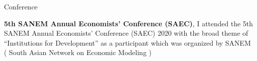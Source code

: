 \begin{rubric}{Conference}

\entry*[2020] \textbf{5th SANEM Annual Economists' Conference (SAEC)}, I attended the 5th SANEM Annual Economists' Conference (SAEC) 2020 with the broad theme of “Institutions for Development” as a participant which was organized by SANEM ( South Asian Network on Economic Modeling )
%

\end{rubric}